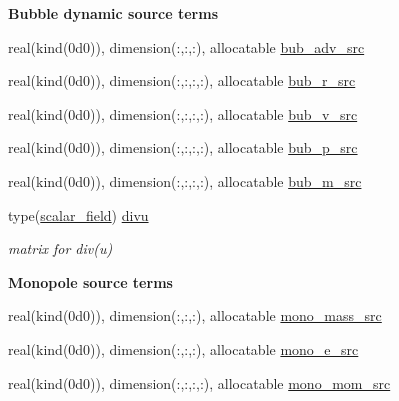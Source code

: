 \begin{Indent}\textbf{ Bubble dynamic source terms}\par
\begin{DoxyCompactItemize}
\item 
real(kind(0d0)), dimension(\+:,\+:,\+:), allocatable \hyperlink{namespacem__rhs_a09ebe4906d3bb2a6656da08fea5a4e49}{bub\+\_\+adv\+\_\+src}
\item 
real(kind(0d0)), dimension(\+:,\+:,\+:,\+:), allocatable \hyperlink{namespacem__rhs_ab1f280657ebd60c51baf22e79dffaeb2}{bub\+\_\+r\+\_\+src}
\item 
real(kind(0d0)), dimension(\+:,\+:,\+:,\+:), allocatable \hyperlink{namespacem__rhs_a35e063bb3f8fd0f8210a6305d01cae96}{bub\+\_\+v\+\_\+src}
\item 
real(kind(0d0)), dimension(\+:,\+:,\+:,\+:), allocatable \hyperlink{namespacem__rhs_ab0521faf3afa606d8ebfd272176f3301}{bub\+\_\+p\+\_\+src}
\item 
real(kind(0d0)), dimension(\+:,\+:,\+:,\+:), allocatable \hyperlink{namespacem__rhs_a45d112ac19bd1a893d86a1a49fd6d6b6}{bub\+\_\+m\+\_\+src}
\item 
type(\hyperlink{structm__derived__types_1_1scalar__field}{scalar\+\_\+field}) \hyperlink{namespacem__rhs_abf83c819d81616e9342f773a4067938c}{divu}
\begin{DoxyCompactList}\small\item\em matrix for div(u) \end{DoxyCompactList}\end{DoxyCompactItemize}
\end{Indent}
\begin{Indent}\textbf{ Monopole source terms}\par
\begin{DoxyCompactItemize}
\item 
real(kind(0d0)), dimension(\+:,\+:,\+:), allocatable \hyperlink{namespacem__rhs_acfcb0aeeb4659d44b0dd6fbf0b82ee79}{mono\+\_\+mass\+\_\+src}
\item 
real(kind(0d0)), dimension(\+:,\+:,\+:), allocatable \hyperlink{namespacem__rhs_a307adefdd895260e42e85872aa306929}{mono\+\_\+e\+\_\+src}
\item 
real(kind(0d0)), dimension(\+:,\+:,\+:,\+:), allocatable \hyperlink{namespacem__rhs_ad2c988fa9d53b74f824dfd0666df27c0}{mono\+\_\+mom\+\_\+src}
\end{DoxyCompactItemize}
\end{Indent}
